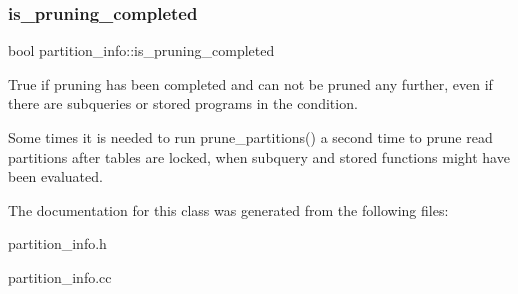 \subsubsection{\texorpdfstring{is\+\_\+pruning\+\_\+completed}{is\_pruning\_completed}}
{\footnotesize\ttfamily bool partition\+\_\+info\+::is\+\_\+pruning\+\_\+completed}

True if pruning has been completed and can not be pruned any further, even if there are subqueries or stored programs in the condition.

Some times it is needed to run prune\+\_\+partitions() a second time to prune read partitions after tables are locked, when subquery and stored functions might have been evaluated. 

The documentation for this class was generated from the following files\+:\begin{DoxyCompactItemize}
\item 
partition\+\_\+info.\+h\item 
partition\+\_\+info.\+cc\end{DoxyCompactItemize}
